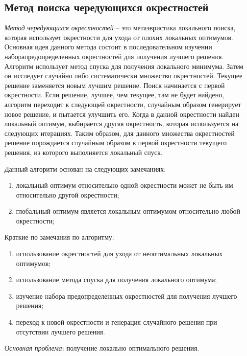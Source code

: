 \subsection{Метод поиска чередующихся окрестностей}
\emph{Метод чередующихся окрестностей} -- это метаэвристика локального поиска, которая использует окрестности 
для ухода от плохих локальных оптимумов. Основная идея данного метода состоит в последовательном изучении 
наборапредопределенных окрестностей для получения лучшего решения. Алгоритм использует метод спуска для 
получения локального минимума. Затем он исследует случайно либо систематически множество окрестностей. 
Текущее решение заменяется новым лучшим решение. Поиск начинается с первой окрестности. Если решение, лучшее, 
чем текущее, там не будет найдено, алгоритм переходит к следующей окрестности, случайным образом генерирует 
новое решение, и пытается улучшить его. Когда в данной окрестности найден локальный оптимум, выбирается 
другая окрестность, которая используется на следующих итерациях. Таким образом, для данного множества 
окрестностей решение порождается случайным образом в первой окрестности текущего решения, из которого 
выполняется локальный спуск.

Данный алгоритм основан на следующих замечаниях:
\begin{enumerate}
    \item локальный оптимум относительно одной окрестности может не быть им относительно другой окрестности;
    \item глобальный оптимум является локальным оптимумом относительно любой окрестности;
\end{enumerate}

Краткие по замечания по алгоритму:
\begin{enumerate}
    \item использование окрестностей для ухода от неоптимальных локальных оптимумов;
    \item использование метода спуска для получения локального оптимума;
    \item изучение набора предопределенных окрестностей для получения лучшего решения;
    \item переход к новой окрестности и генерация случайного решения при отсутствии лучшего решения.
\end{enumerate}

\emph{Основная проблема:} получение локально оптимального решения.

